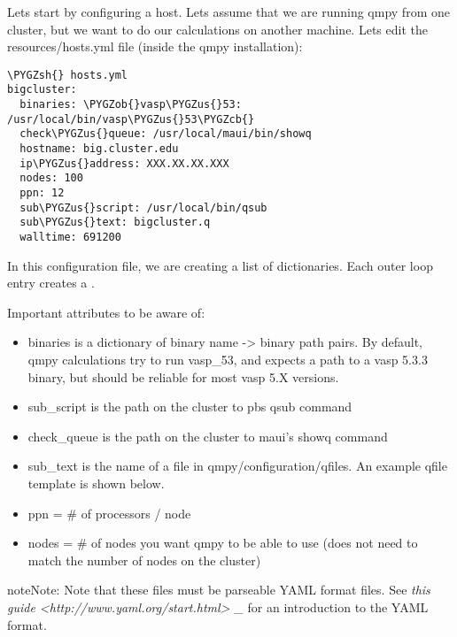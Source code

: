 \documentclass[letterpaper,10pt,english]{sphinxmanual}
\def\PYGZus{\char`\_}
\def\PYGZob{\char`\{}
\def\PYGZcb{\char`\}}
\def\PYGZsh{\char`\#}
\begin{document}
Lets start by configuring a host. Lets assume that we are running qmpy from one
cluster, but we want to do our calculations on another machine. Lets edit the
resources/hosts.yml file (inside the qmpy installation):

\begin{Verbatim}[commandchars=\\\{\}]
\PYGZsh{} hosts.yml
bigcluster:
  binaries: \PYGZob{}vasp\PYGZus{}53: /usr/local/bin/vasp\PYGZus{}53\PYGZcb{}
  check\PYGZus{}queue: /usr/local/maui/bin/showq
  hostname: big.cluster.edu
  ip\PYGZus{}address: XXX.XX.XX.XXX
  nodes: 100
  ppn: 12
  sub\PYGZus{}script: /usr/local/bin/qsub
  sub\PYGZus{}text: bigcluster.q
  walltime: 691200
\end{Verbatim}

In this configuration file, we are creating a list of dictionaries. Each outer
loop entry creates a {\hyperref[models:qmpy.Host]{}}.

Important attributes to be aware of:
\begin{itemize}
\item {} 
binaries is a dictionary of binary name -\textgreater{} binary path pairs. By default,
qmpy calculations try to run vasp\_53, and expects a path to a vasp 5.3.3
binary, but should be reliable for most vasp 5.X versions.

\item {} 
sub\_script is the path on the cluster to pbs qsub command

\item {} 
check\_queue is the path on the cluster to maui's showq command

\item {} 
sub\_text is the name of a file in qmpy/configuration/qfiles. An example qfile
template is shown below.

\item {} 
ppn = \# of processors / node

\item {} 
nodes = \# of nodes you want qmpy to be able to use (does not need to match
the number of nodes on the cluster)

\end{itemize}

\begin{notice}{note}{Note:}
Note that these files must be parseable YAML format files. See \emph{this guide
\textless{}http://www.yaml.org/start.html\textgreater{} \_} for an introduction to the YAML format.
\end{notice}
\end{document}
